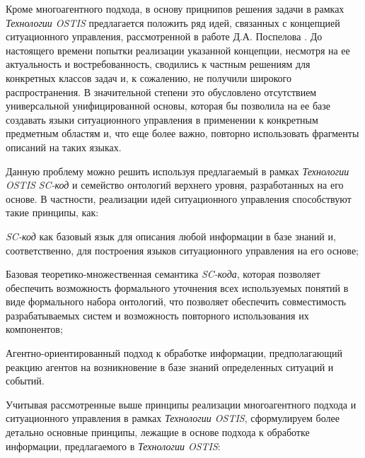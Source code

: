 Кроме многоагентного подхода, в основу прицнипов решения задачи в рамках \textit{Технологии OSTIS} предлагается положить ряд идей, связанных с концепцией ситуационного управления, рассмотренной в работе Д.А. Поспелова . До настоящего времени попытки реализации указанной концепции, несмотря на ее актуальность и востребованность, сводились к частным решениям для конкретных классов задач и, к сожалению, не получили широкого распространения. В значительной степени это обусловлено отсутствием универсальной унифицированной основы, которая бы позволила на ее базе создавать языки ситуационного управления в применении к конкретным предметным областям и, что еще более важно, повторно использовать фрагменты описаний на таких языках.

Данную проблему можно решить используя предлагаемый в рамках \textit{Технологии OSTIS} \textit{SC-код} и семейство онтологий верхнего уровня, разработанных на его основе. В частности, реализации идей ситуационного управления способствуют такие принципы, как:
\begin{textitemize}
	\item \textit{SC-код} как базовый язык для описания любой информации в базе знаний и, соответственно, для построения языков ситуационного управления на его основе;
	\item Базовая теоретико-множественная семантика \textit{SC-кода}, которая позволяет обеспечить возможность формального уточнения всех используемых понятий в виде формального набора онтологий, что позволяет обеспечить совместимость разрабатываемых систем и возможность повторного использования их компонентов;
	\item Агентно-ориентированный подход к обработке информации, предполагающий реакцию агентов на возникновение в базе знаний определенных ситуаций и событий.
\end{textitemize}

Учитывая рассмотренные выше принципы реализации многоагентного подхода и ситуационного управления в рамках \textit{Технологии OSTIS}, сформулируем более детально основные принципы, лежащие в основе подхода к обработке информации, предлагаемого в \textit{Технологии OSTIS}:

